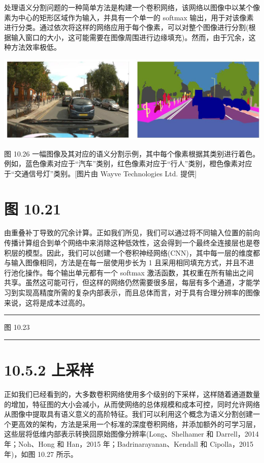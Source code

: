 \documentclass[10pt]{report}
\newcommand{\HRule}{\begin{center}\rule{0.9\linewidth}{0.2mm}\end{center}}
\begin{document}
处理语义分割问题的一种简单方法是构建一个卷积网络，该网络以图像中以某个像素为中心的矩形区域作为输入，并具有一个单一的 softmax 输出，用于对该像素进行分类。通过依次将这样的网络应用于每个像素，可以对整个图像进行分割(根据输入窗口的大小，这可能需要在图像周围进行边缘填充)。然而，由于冗余，这种方法效率极低。

\begin{center}
\includegraphics[max width=1.0\textwidth]{images/0194e279-9b28-703a-88f4-c3ac21e2010d_335_240_346_1305_407_0.jpg}
\end{center}
\hspace*{3em} 

图 10.26 一幅图像及其对应的语义分割示例，其中每个像素根据其类别进行着色。例如，蓝色像素对应于“汽车”类别，红色像素对应于“行人”类别，橙色像素对应于“交通信号灯”类别。[图片由 Wayve Technologies Ltd. 提供]

\section*{图 10.21}

由重叠补丁导致的冗余计算。正如我们所见，我们可以通过将不同输入位置的前向传播计算组合到单个网络中来消除这种低效性，这会得到一个最终全连接层也是卷积层的模型。因此，我们可以创建一个卷积神经网络(CNN)，其中每一层的维度都与输入图像相同，方法是在每一层使用步长为 1 且采用相同填充方式，并且不进行池化操作。每个输出单元都有一个 softmax 激活函数，其权重在所有输出之间共享。虽然这可能可行，但这样的网络仍然需要很多层，每层有多个通道，才能学习到实现高精度所需的复杂内部表示，而且总体而言，对于具有合理分辨率的图像来说，这将是成本过高的。

\HRule

图 10.23

\HRule

\section*{10.5.2 上采样}

正如我们已经看到的，大多数卷积网络使用多个级别的下采样，这样随着通道数量的增加，特征图的大小会减小，从而使网络的总体规模和成本可控，同时允许网络从图像中提取具有语义意义的高阶特征。我们可以利用这个概念为语义分割创建一个更高效的架构，方法是采用一个标准的深度卷积网络，并添加额外的可学习层，这些层将低维内部表示转换回原始图像分辨率(Long、Shelhamer 和 Darrell，2014 年；Noh、Hong 和 Han，2015 年；Badrinarayanan、Kendall 和 Cipolla，2015 年)，如图 10.27 所示。
\end{document}
